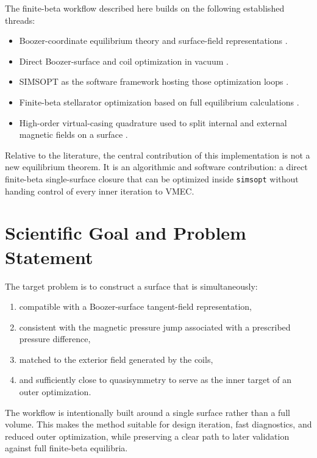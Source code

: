 \documentclass[11pt]{article}
\begin{document}
The finite-beta workflow described here builds on the following established threads:

\begin{itemize}
\item Boozer-coordinate equilibrium theory and surface-field representations \cite{Boozer1981}.
\item Direct Boozer-surface and coil optimization in vacuum \cite{Giuliani2022,Giuliani2023,Wechsung2022}.
\item SIMSOPT as the software framework hosting those optimization loops \cite{Landreman2021}.
\item Finite-beta stellarator optimization based on full equilibrium calculations \cite{Baillod2022}.
\item High-order virtual-casing quadrature used to split internal and external magnetic fields on a surface \cite{Malhotra2020}.
\end{itemize}

Relative to the literature, the central contribution of this implementation is not a new equilibrium theorem. It is an algorithmic and software contribution: a direct finite-beta single-surface closure that can be optimized inside \texttt{simsopt} without handing control of every inner iteration to VMEC.

\section{Scientific Goal and Problem Statement}
The target problem is to construct a surface that is simultaneously:

\begin{enumerate}
\item compatible with a Boozer-surface tangent-field representation,
\item consistent with the magnetic pressure jump associated with a prescribed pressure difference,
\item matched to the exterior field generated by the coils,
\item and sufficiently close to quasisymmetry to serve as the inner target of an outer optimization.
\end{enumerate}

The workflow is intentionally built around a single surface rather than a full volume. This makes the method suitable for design iteration, fast diagnostics, and reduced outer optimization, while preserving a clear path to later validation against full finite-beta equilibria.
\end{document}
